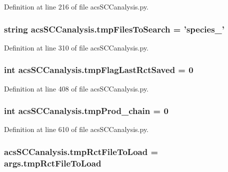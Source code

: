 Definition at line 216 of file acs\+S\+C\+Canalysis.\+py.

\hypertarget{a00130_a141356fc914110fdf3ec4f0fc3beaab5}{
\subsubsection[{tmp\+Files\+To\+Search}]{\setlength{\rightskip}{0pt plus 5cm}string acs\+S\+C\+Canalysis.\+tmp\+Files\+To\+Search = 'species\+\_\+'}}\label{a00130_a141356fc914110fdf3ec4f0fc3beaab5}


Definition at line 310 of file acs\+S\+C\+Canalysis.\+py.

\hypertarget{a00130_a6e8aff976901d1424dd1ff00c3387014}{
\subsubsection[{tmp\+Flag\+Last\+Rct\+Saved}]{\setlength{\rightskip}{0pt plus 5cm}int acs\+S\+C\+Canalysis.\+tmp\+Flag\+Last\+Rct\+Saved = 0}}\label{a00130_a6e8aff976901d1424dd1ff00c3387014}


Definition at line 408 of file acs\+S\+C\+Canalysis.\+py.

\hypertarget{a00130_aee6b4f50387d471b70458cf703c0863b}{
\subsubsection[{tmp\+Prod\+\_\+chain}]{\setlength{\rightskip}{0pt plus 5cm}int acs\+S\+C\+Canalysis.\+tmp\+Prod\+\_\+chain = 0}}\label{a00130_aee6b4f50387d471b70458cf703c0863b}


Definition at line 610 of file acs\+S\+C\+Canalysis.\+py.

\hypertarget{a00130_aa2f655aa323f5eaef7509135b8af5722}{
\subsubsection[{tmp\+Rct\+File\+To\+Load}]{\setlength{\rightskip}{0pt plus 5cm}acs\+S\+C\+Canalysis.\+tmp\+Rct\+File\+To\+Load = args.\+tmp\+Rct\+File\+To\+Load}}\label{a00130_aa2f655aa323f5eaef7509135b8af5722}


